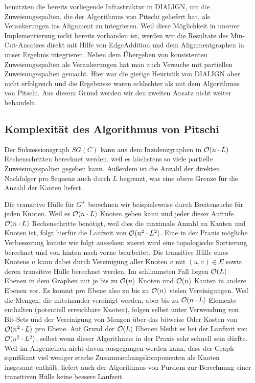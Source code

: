 \cite{cpm10} benutzten die bereits vorliegende Infrastruktur in DIALIGN, um die Zuweisungsspalten, die der Algorithmus von Pitschi geliefert hat, als Verankerungen ins Alignment zu integrieren. Weil diese Möglichkeit in unserer Implementierung nicht bereits vorhanden ist, werden wir die Resultate des Min-Cut-Ansatzes direkt mit Hilfe von \textrm{EdgeAddition} und dem Alignmentgraphen in unser Ergebnis integrieren. Neben dem Übergeben von konsistenten Zuweisungsspalten als Verankerungen hat man auch Versuche mit partiellen Zuweisungsspalten gemacht. Hier war die gierige Heuristik von DIALIGN aber nicht erfolgreich und die Ergebnisse waren schlechter als mit dem Algorithmus von Pitschi. Aus diesem Grund werden wir den zweiten Ansatz nicht weiter behandeln.

\subsection{Komplexität des Algorithmus von Pitschi}

Der Sukzessionsgraph $SG(C)$ kann aus dem Inzidenzgraphen in $\mathcal{O}(n\cdot L)$ Rechenschritten berechnet werden, weil es höchstens so viele partielle Zuweisungsspalten gegeben kann. Außerdem ist die Anzahl der direkten Nachfolger pro Sequenz auch durch $L$ begrenzt, was eine obere Grenze für die Anzahl der Kanten liefert.

Die transitive Hülle für $G^{+}$ berechnen wir beispielsweise durch Breitensuche für jeden Knoten. Weil es $\mathcal{O}(n\cdot L)$ Knoten geben kann und jeder dieser Aufrufe $\mathcal{O}(n\cdot L)$ Rechenschritte benötigt, weil dies die maximale Anzahl an Kanten und Knoten ist, folgt hierfür die Laufzeit von $\mathcal{O}(n^2\cdot L^2)$. Eine in der Praxis mögliche Verbesserung könnte wie folgt aussehen: zuerst wird eine topologische Sortierung berechnet und von hinten nach vorne bearbeitet. Die transitive Hülle eines Knotens $u$ kann dabei durch Vereinigung aller Knoten $v$ mit $(u,v) \in E$ sowie deren transitive Hülle berechnet werden. Im schlimmsten Fall liegen $\mathcal{O}(L)$ Ebenen in dem Graphen mit je bis zu $\mathcal{O}(n)$ Knoten und $\mathcal{O}(n)$ Kanten in andere Ebenen vor. Es kommt pro Ebene also zu bis zu $\mathcal{O}(n)$ vielen Vereinigungen. Weil die Mengen, die miteinander vereinigt werden, aber bis zu $\mathcal{O}(n\cdot L)$ Elemente enthalten (potentiell erreichbare Knoten), folgen selbst unter Verwendung von Bit-Sets und der Vereinigung von Mengen über das bitweise Oder Kosten von $\mathcal{O}(n^2\cdot L)$ pro Ebene. Auf Grund der $\mathcal{O}(L)$ Ebenen bleibt es bei der Laufzeit von $\mathcal{O}(n^2\cdot L^2)$, selbst wenn dieser Algorithmus in der Praxis sehr schnell sein dürfte. Weil im Allgemeinen nicht davon ausgegangen werden kann, dass der Graph signifikant viel weniger starke Zusammenhangskomponenten als Knoten insgesamt enthält, liefert auch der Algorithmus von Purdom zur Berechnung einer transitiven Hülle keine bessere Laufzeit.

